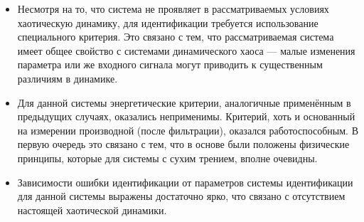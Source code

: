 \begin{itemize}

  \item
    Несмотря на то, что система не проявляет в рассматриваемых условиях хаотическую динамику,
    для идентификации требуется использование специального критерия. Это связано с тем,
    что рассматриваемая система имеет общее свойство с системами динамического хаоса ---
    малые изменения параметра или же входного сигнала могут приводить к
    существенным различиям в динамике.

  \item
    Для данной системы энергетические критерии, аналогичные применённым в предыдущих случаях,
    оказались неприменимы. Критерий, хоть и основанный на измерении производной (после фильтрации),
    оказался работоспособным. В первую очередь это связано с тем, что в основе были положены
    физические принципы, которые для системы с сухим трением, вполне очевидны.

  \item
    Зависимости ошибки идентификации от параметров системы идентификации
    для данной системы выражены достаточно ярко,
    что связано с отсутствием настоящей хаотической динамики.

\end{itemize}







